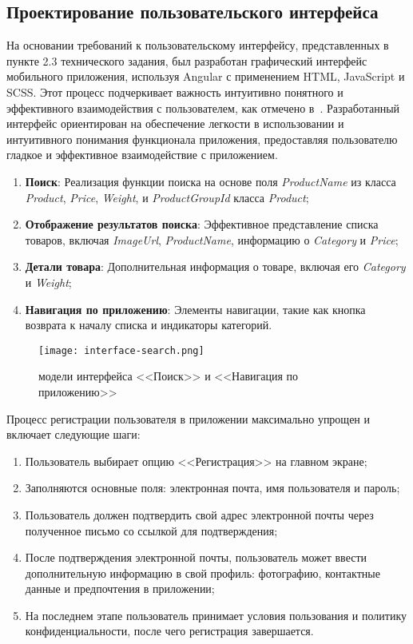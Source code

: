\subsection{Проектирование пользовательского интерфейса}

На основании требований к пользовательскому интерфейсу, представленных в пункте 2.3 технического задания, был разработан графический интерфейс мобильного приложения, используя Angular с применением HTML, JavaScript и SCSS. Этот процесс подчеркивает важность интуитивно понятного и эффективного взаимодействия с пользователем, как отмечено в~\cite{kumskova}.
Разработанный интерфейс ориентирован на обеспечение легкости в использовании и интуитивного понимания функционала приложения, предоставляя пользователю гладкое и эффективное взаимодействие с приложением.

\begin{enumerate}
    \item \textbf{Поиск}: Реализация функции поиска на основе поля \textit{ProductName} из класса \textit{Product}, \textit{Price}, \textit{Weight}, и \textit{ProductGroupId} класса \textit{Product};
    \item \textbf{Отображение результатов поиска}: Эффективное представление списка товаров, включая \textit{ImageUrl}, \textit{ProductName}, информацию о \textit{Category} и \textit{Price};
    \item \textbf{Детали товара}: Дополнительная информация о товаре, включая его \textit{Category} и \textit{Weight};
    \item \textbf{Навигация по приложению}: Элементы навигации, такие как кнопка возврата к началу списка и индикаторы категорий.
\end{enumerate}

\begin{figure}[h!]
    \texttt{[image: interface-search.png]}
    \caption{модели интерфейса <<Поиск>> и <<Навигация по приложению>>}
    \label{fig:search}
\end{figure}

Процесс регистрации пользователя в приложении максимально упрощен и включает следующие шаги:
\begin{enumerate}
    \item Пользователь выбирает опцию <<Регистрация>> на главном экране;
    \item Заполняются основные поля: электронная почта, имя пользователя и пароль;
    \item Пользователь должен подтвердить свой адрес электронной почты через полученное письмо со ссылкой для подтверждения;
    \item После подтверждения электронной почты, пользователь может ввести дополнительную информацию в свой профиль: фотографию, контактные данные и предпочтения в приложении;
    \item На последнем этапе пользователь принимает условия пользования и политику конфиденциальности, после чего регистрация завершается.
\end{enumerate}


